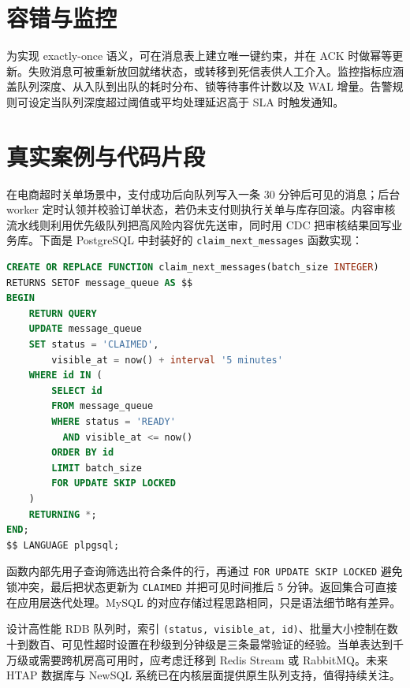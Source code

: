 \chapter{容错与监控}
为实现 exactly-once 语义，可在消息表上建立唯一键约束，并在 ACK 时做幂等更新。失败消息可被重新放回就绪状态，或转移到死信表供人工介入。监控指标应涵盖队列深度、从入队到出队的耗时分布、锁等待事件计数以及 WAL 增量。告警规则可设定当队列深度超过阈值或平均处理延迟高于 SLA 时触发通知。\par
\chapter{真实案例与代码片段}
在电商超时关单场景中，支付成功后向队列写入一条 30 分钟后可见的消息；后台 worker 定时认领并校验订单状态，若仍未支付则执行关单与库存回滚。内容审核流水线则利用优先级队列把高风险内容优先送审，同时用 CDC 把审核结果回写业务库。下面是 PostgreSQL 中封装好的 \texttt{claim\_{}next\_{}messages} 函数实现：\par
\begin{lstlisting}[language=sql]
CREATE OR REPLACE FUNCTION claim_next_messages(batch_size INTEGER)
RETURNS SETOF message_queue AS $$
BEGIN
    RETURN QUERY
    UPDATE message_queue
    SET status = 'CLAIMED',
        visible_at = now() + interval '5 minutes'
    WHERE id IN (
        SELECT id
        FROM message_queue
        WHERE status = 'READY'
          AND visible_at <= now()
        ORDER BY id
        LIMIT batch_size
        FOR UPDATE SKIP LOCKED
    )
    RETURNING *;
END;
$$ LANGUAGE plpgsql;
\end{lstlisting}
函数内部先用子查询筛选出符合条件的行，再通过 \texttt{FOR UPDATE SKIP LOCKED} 避免锁冲突，最后把状态更新为 \texttt{CLAIMED} 并把可见时间推后 5 分钟。返回集合可直接在应用层迭代处理。MySQL 的对应存储过程思路相同，只是语法细节略有差异。\par
设计高性能 RDB 队列时，索引 \texttt{(status, visible\_{}at, id)}、批量大小控制在数十到数百、可见性超时设置在秒级到分钟级是三条最常验证的经验。当单表达到千万级或需要跨机房高可用时，应考虑迁移到 Redis Stream 或 RabbitMQ。未来 HTAP 数据库与 NewSQL 系统已在内核层面提供原生队列支持，值得持续关注。\par
